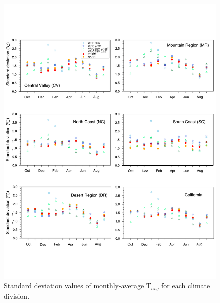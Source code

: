 \documentclass[draft,ms]{agutex}   %
\begin{document}
\begin{figure}
\begin{center}
\includegraphics[width=6in]{trd_t2avg_allzones_std.pdf}
\end{center}
\caption{Standard deviation values of monthly-average T$_{avg}$ for each climate division.} \label{fig:Figure 7}
\end{figure}
\end{document}
